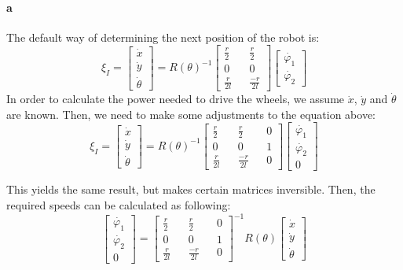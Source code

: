 \documentclass[12pt]{article}
\begin{document}
\paragraph{a} The default way of determining the next position of the robot is:
\begin{equation}
\xi_I = 
\begin{bmatrix} \dot{x} \\ \dot{y} \\ \dot{\theta} \end{bmatrix}
= 
R(\theta)^{-1}
\begin{bmatrix} \frac{r}{2} && \frac{r}{2} \\ 
0 && 0  \\ 
\frac{r}{2l} && \frac{-r}{2l}\end{bmatrix}
\begin{bmatrix}
\dot{\varphi_1} \\
\dot{\varphi_2}
\end{bmatrix}
\end{equation}
In order to calculate the power needed to drive the wheels, we assume $\dot{x}$, $\dot{y}$ and $\dot{\theta}$ are known. Then, we need to make some adjustments to the equation above:
\begin{equation}
\xi_I = 
\begin{bmatrix} \dot{x} \\ \dot{y} \\ \dot{\theta} \end{bmatrix}
= 
R(\theta)^{-1}
\begin{bmatrix} \frac{r}{2} && \frac{r}{2} && 0 \\ 
0 && 0  && 1\\ 
\frac{r}{2l} && \frac{-r}{2l} && 0\end{bmatrix}
\begin{bmatrix}
\dot{\varphi_1} \\
\dot{\varphi_2} \\
0
\end{bmatrix}
\end{equation}

This yields the same result, but makes certain matrices inversible. Then, the required speeds can be calculated as following:
\begin{equation}
\begin{bmatrix}
\dot{\varphi_1} \\
\dot{\varphi_2} \\
0
\end{bmatrix}
= 
\begin{bmatrix} \frac{r}{2} && \frac{r}{2} && 0 \\ 
0 && 0  && 1\\ 
\frac{r}{2l} && \frac{-r}{2l} && 0\end{bmatrix}^{-1}
R(\theta)
\begin{bmatrix} \dot{x} \\ \dot{y} \\ \dot{\theta} \end{bmatrix}
\end{equation}
\end{document}
